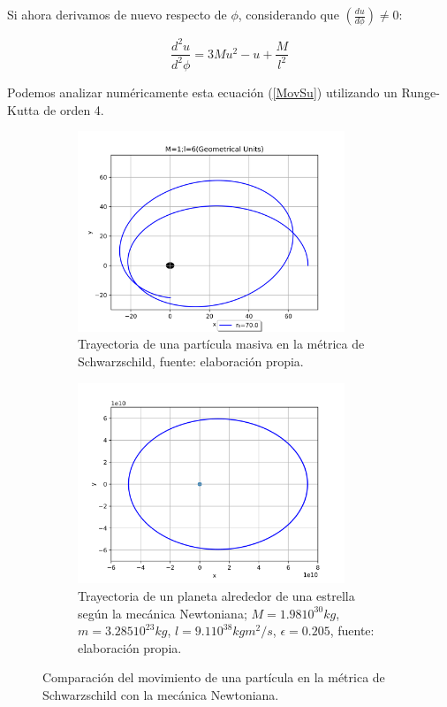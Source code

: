 \documentclass{article}
\begin{document}
Si ahora derivamos de nuevo respecto de $\phi$, considerando que $\left(\frac{d u}{d\phi}\right)\neq0$:\cite{zamorageodesicas}

\begin{equation}\label{MovSu}
    \frac{d^{2}u}{d^{2}\phi}=3Mu^{2}-u+\frac{M}{l^{2}}
\end{equation}

Podemos analizar numéricamente esta ecuación (\ref{MovSu}) utilizando un Runge-Kutta de orden 4.
\begin{figure}[H]
\begin{subfigure}{0.5\textwidth}
\includegraphics[width=0.9\linewidth, height=6cm]{SchwarzschildOrbit.png} 
\caption{Trayectoria de una partícula masiva en la métrica de Schwarzschild, fuente: elaboración propia.}
\label{fig:SchwarzschildOrbit}
\end{subfigure}\hspace{1cm}
\begin{subfigure}{0.5\textwidth}
\includegraphics[width=0.9\linewidth, height=6cm]{ClassicOrbit.png}
\caption{Trayectoria de un planeta alrededor de una estrella según la mecánica Newtoniana; $M=1.98 10^{30}kg$, $m=3.285 10^{23}kg$, $l=9.1 10^{38}kg m^{2}/s$, $\epsilon=0.205$, fuente: elaboración propia.}
\label{fig:ClassicOrbit}
\end{subfigure}
\caption{Comparación del movimiento de una partícula en la métrica de Schwarzschild con la mecánica Newtoniana.}
\label{fig:image2}
\end{figure}
\end{document}
